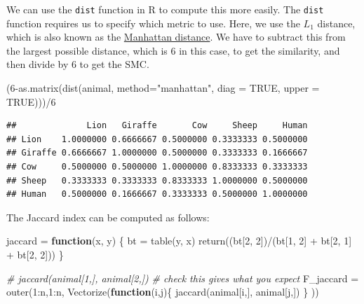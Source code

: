 \documentclass[
]{book}
\newenvironment{Shaded}{\begin{snugshade}}{\end{snugshade}}
\newcommand{\AttributeTok}[1]{\textcolor[rgb]{0.77,0.63,0.00}{#1}}
\newcommand{\CommentTok}[1]{\textcolor[rgb]{0.56,0.35,0.01}{\textit{#1}}}
\newcommand{\ConstantTok}[1]{\textcolor[rgb]{0.00,0.00,0.00}{#1}}
\newcommand{\ControlFlowTok}[1]{\textcolor[rgb]{0.13,0.29,0.53}{\textbf{#1}}}
\newcommand{\DecValTok}[1]{\textcolor[rgb]{0.00,0.00,0.81}{#1}}
\newcommand{\FunctionTok}[1]{\textcolor[rgb]{0.00,0.00,0.00}{#1}}
\newcommand{\NormalTok}[1]{#1}
\newcommand{\OtherTok}[1]{\textcolor[rgb]{0.56,0.35,0.01}{#1}}
\newcommand{\SpecialCharTok}[1]{\textcolor[rgb]{0.00,0.00,0.00}{#1}}
\newcommand{\StringTok}[1]{\textcolor[rgb]{0.31,0.60,0.02}{#1}}
\theoremstyle{definition}
\theoremstyle{definition}
\theoremstyle{definition}
\theoremstyle{definition}
\theoremstyle{remark}
\begin{document}
We can use the \texttt{dist} function in R to compute this more easily. The \texttt{dist} function requires us to specify which metric to use. Here, we use the \(L_1\) distance, which is also known as the \href{https://en.wikipedia.org/wiki/Taxicab_geometry}{Manhattan distance}. We have to subtract this from the largest possible distance, which is 6 in this case, to get the similarity, and then divide by 6 to get the SMC.

\begin{Shaded}
\begin{Highlighting}[]
\NormalTok{(}\DecValTok{6}\SpecialCharTok{{-}}\FunctionTok{as.matrix}\NormalTok{(}\FunctionTok{dist}\NormalTok{(animal, }\AttributeTok{method=}\StringTok{"manhattan"}\NormalTok{, }\AttributeTok{diag =} \ConstantTok{TRUE}\NormalTok{, }
                  \AttributeTok{upper =} \ConstantTok{TRUE}\NormalTok{)))}\SpecialCharTok{/}\DecValTok{6}
\end{Highlighting}
\end{Shaded}

\begin{verbatim}
##              Lion   Giraffe       Cow     Sheep     Human
## Lion    1.0000000 0.6666667 0.5000000 0.3333333 0.5000000
## Giraffe 0.6666667 1.0000000 0.5000000 0.3333333 0.1666667
## Cow     0.5000000 0.5000000 1.0000000 0.8333333 0.3333333
## Sheep   0.3333333 0.3333333 0.8333333 1.0000000 0.5000000
## Human   0.5000000 0.1666667 0.3333333 0.5000000 1.0000000
\end{verbatim}

The Jaccard index can be computed as follows:

\begin{Shaded}
\begin{Highlighting}[]
\NormalTok{jaccard }\OtherTok{=} \ControlFlowTok{function}\NormalTok{(x, y) \{}
\NormalTok{  bt }\OtherTok{=} \FunctionTok{table}\NormalTok{(y, x)}
  \FunctionTok{return}\NormalTok{((bt[}\DecValTok{2}\NormalTok{, }\DecValTok{2}\NormalTok{])}\SpecialCharTok{/}\NormalTok{(bt[}\DecValTok{1}\NormalTok{, }\DecValTok{2}\NormalTok{] }\SpecialCharTok{+}\NormalTok{ bt[}\DecValTok{2}\NormalTok{, }\DecValTok{1}\NormalTok{] }\SpecialCharTok{+}\NormalTok{ bt[}\DecValTok{2}\NormalTok{, }\DecValTok{2}\NormalTok{]))}
\NormalTok{\}}

\CommentTok{\# jaccard(animal[1,], animal[2,]) }
\CommentTok{\# check this gives what you expect}
\NormalTok{F\_jaccard }\OtherTok{=} \FunctionTok{outer}\NormalTok{(}\DecValTok{1}\SpecialCharTok{:}\NormalTok{n,}\DecValTok{1}\SpecialCharTok{:}\NormalTok{n, }\FunctionTok{Vectorize}\NormalTok{(}\ControlFlowTok{function}\NormalTok{(i,j)\{}
  \FunctionTok{jaccard}\NormalTok{(animal[i,], animal[j,])}
\NormalTok{  \}}
\NormalTok{  ))}
\end{Highlighting}
\end{Shaded}
\end{document}
